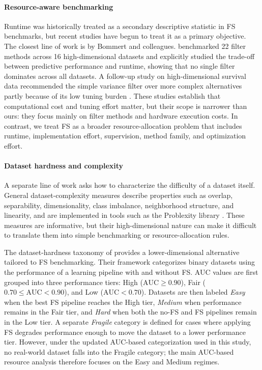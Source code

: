 \documentclass[preprint,12pt,authoryear]{elsarticle}
\begin{document}
{\paragraph{Resource-aware benchmarking}
Runtime was historically treated as a secondary descriptive statistic in FS benchmarks, but recent studies have begun to treat it as a primary objective. The closest line of work is by Bommert and colleagues. \citet{Bommert2019FilterBenchmark} benchmarked 22 filter methods across 16 high-dimensional datasets and explicitly studied the trade-off between predictive performance and runtime, showing that no single filter dominates across all datasets. A follow-up study on high-dimensional survival data recommended the simple variance filter over more complex alternatives partly because of its low tuning burden \citep{Bommert2022FilterFSurvival}. These studies establish that computational cost and tuning effort matter, but their scope is narrower than ours: they focus mainly on filter methods and hardware execution costs. In contrast, we treat FS as a broader resource-allocation problem that includes runtime, implementation effort, supervision, method family, and optimization effort.

\paragraph{Dataset hardness and complexity}
A separate line of work asks how to characterize the difficulty of a dataset itself. General dataset-complexity measures describe properties such as overlap, separability, dimensionality, class imbalance, neighborhood structure, and linearity, and are implemented in tools such as the Problexity library \citep{Komorniczak2023Problexity}. These measures are informative, but their high-dimensional nature can make it difficult to translate them into simple benchmarking or resource-allocation rules.

The dataset-hardness taxonomy of \citet{elmakias2025choosing} provides a lower-dimensional alternative tailored to FS benchmarking. Their framework categorizes binary datasets using the performance of a learning pipeline with and without FS. AUC values are first grouped into three performance tiers: High ($\mathrm{AUC}\geq 0.90$), Fair ($0.70 \leq \mathrm{AUC}<0.90$), and Low ($\mathrm{AUC}<0.70$). Datasets are then labeled \emph{Easy} when the best FS pipeline reaches the High tier, \emph{Medium} when performance remains in the Fair tier, and \emph{Hard} when both the no-FS and FS pipelines remain in the Low tier. A separate \emph{Fragile} category is defined for cases where applying FS degrades performance enough to move the dataset to a lower performance tier. However, under the updated AUC-based categorization used in this study, no real-world dataset falls into the Fragile category; the main AUC-based resource analysis therefore focuses on the Easy and Medium regimes.

}
\end{document}
